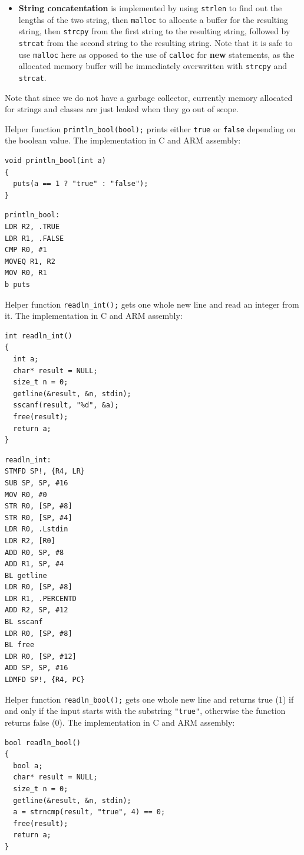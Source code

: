 \documentclass[nonacm, acmsmall, screen, 10pt]{acmart}
\begin{document}
\begin{itemize}
\begin{itemize}
        \end{itemize}
  \item \textbf{String concatentation} is implemented by using \texttt{strlen} to find out the lengths of the two string, then \texttt{malloc} to allocate a buffer for the resulting string, then \texttt{strcpy} from the first string to the resulting string, followed by \texttt{strcat} from the second string to the resulting string.
        Note that it is safe to use \texttt{malloc} here as opposed to the use of \texttt{calloc} for \textbf{new} statements, as the allocated memory buffer will be immediately overwritten with \texttt{strcpy} and \texttt{strcat}.
\end{itemize}

Note that since we do not have a garbage collector, currently memory allocated for strings and classes are just leaked when they go out of scope.

Helper function \texttt{println_bool(bool);} prints either \texttt{true} or \texttt{false} depending on the boolean value.
The implementation in C and ARM assembly:
\begin{verbatim}
void println_bool(int a)
{
  puts(a == 1 ? "true" : "false");
}
\end{verbatim}

\begin{verbatim}
println_bool:
LDR R2, .TRUE
LDR R1, .FALSE
CMP R0, #1
MOVEQ R1, R2
MOV R0, R1
b puts
\end{verbatim}

Helper function \texttt{readln_int();} gets one whole new line and read an integer from it.
The implementation in C and ARM assembly:
\begin{verbatim}
int readln_int()
{
  int a;
  char* result = NULL;
  size_t n = 0;
  getline(&result, &n, stdin);
  sscanf(result, "%d", &a);
  free(result);
  return a;
}
\end{verbatim}

\begin{verbatim}
readln_int:
STMFD SP!, {R4, LR}
SUB SP, SP, #16
MOV R0, #0
STR R0, [SP, #8]
STR R0, [SP, #4]
LDR R0, .Lstdin
LDR R2, [R0]
ADD R0, SP, #8
ADD R1, SP, #4
BL getline
LDR R0, [SP, #8]
LDR R1, .PERCENTD
ADD R2, SP, #12
BL sscanf
LDR R0, [SP, #8]
BL free
LDR R0, [SP, #12]
ADD SP, SP, #16
LDMFD SP!, {R4, PC}
\end{verbatim}

Helper function \texttt{readln_bool();} gets one whole new line and returns true (1) if and only if the input starts with the substring \texttt{"true"}, otherwise the function returns false (0).
The implementation in C and ARM assembly:
\begin{verbatim}
bool readln_bool()
{
  bool a;
  char* result = NULL;
  size_t n = 0;
  getline(&result, &n, stdin);
  a = strncmp(result, "true", 4) == 0;
  free(result);
  return a;
}
\end{verbatim}
\end{document}
